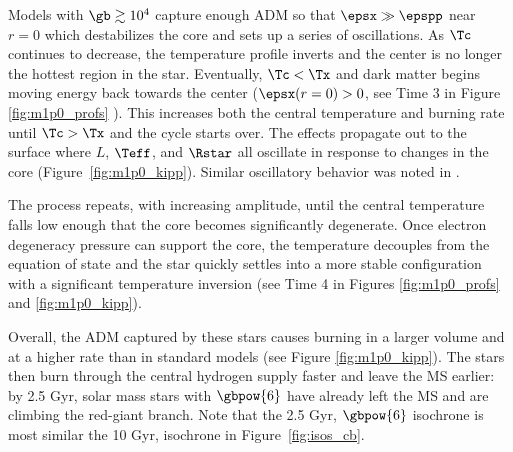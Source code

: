 

Models with $\gb \gtrsim 10^4$ capture enough ADM so that $\epsx \gg \epspp$ near $r=0$ which destabilizes the core and sets up a series of oscillations.
As $\Tc$ continues to decrease, the temperature profile inverts and the center is no longer the hottest region in the star. Eventually, $\Tc < \Tx$ and dark matter begins moving energy back towards the center ($\epsx(r=0) > 0$, see Time 3 in Figure \ref{fig:m1p0_profs} ). This increases both the central temperature and burning rate until $\Tc > \Tx$ and the cycle starts over. The effects propagate out to the surface where
$L$, $\Teff$, and $\Rstar$ all oscillate in response to changes in the core (Figure~\ref{fig:m1p0_kipp}). Similar oscillatory behavior was noted in \citet{Iocco2012} .

The process repeats, with increasing amplitude, until the central temperature falls low enough that the core becomes significantly degenerate. Once electron degeneracy pressure can support the core, the temperature decouples from the equation of state and the star quickly settles into a more stable configuration with a significant temperature inversion (see Time 4 in Figures \ref{fig:m1p0_profs} and \ref{fig:m1p0_kipp}).

Overall, the ADM captured by these stars causes burning in a larger volume and at a higher rate than in standard models (see Figure \ref{fig:m1p0_kipp}). The stars then burn through the central hydrogen supply faster and leave the MS earlier: by 2.5 Gyr, solar mass stars with $\gbpow{6}$ have already left the MS and are climbing the red-giant branch. Note that the 2.5 Gyr, $\gbpow{6}$ isochrone is most similar the 10 Gyr, \nodm isochrone in Figure~\ref{fig:isos_cb}.
